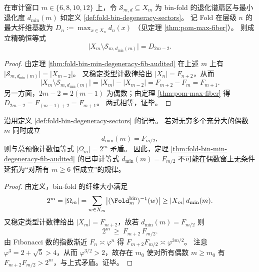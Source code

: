 \begin{corollary}\label{cor:fold-bin-minsector-complement-maxfiber-audited}
在审计窗口 \(m\in\{6,8,10,12\}\) 上，令 \(\mathcal{S}_{m,d}\subseteq X_m\) 为 bin-fold 的退化谱扇区与最小退化度 \(d_{\min}(m)\) 如定义 \ref{def:fold-bin-degeneracy-sectors}。
记 Fold 在层级 \(n\) 的最大纤维基数为
\(
D_n:=\max_{x\in X_n} d_n(x)
\)
（见定理 \ref{thm:pom-max-fiber}）。
则成立精确恒等式
\[
\bigl|X_m\setminus \mathcal{S}_{m,d_{\min}(m)}\bigr| = D_{2m-2}.
\]
\end{corollary}
\begin{proof}
由定理 \ref{thm:fold-bin-min-degeneracy-fib-audited} 在上述 \(m\) 上有 \(\bigl|\mathcal{S}_{m,d_{\min}(m)}\bigr|=|X_{m-2}|\)。
又稳定类型计数律给出 \(|X_n|=F_{n+2}\)，从而
\[
\bigl|X_m\setminus \mathcal{S}_{m,d_{\min}(m)}\bigr|
=|X_m|-|X_{m-2}|
=F_{m+2}-F_m
=F_{m+1}.
\]
另一方面，\(2m-2=2(m-1)\) 为偶数；由定理 \ref{thm:pom-max-fiber} 得
\(
D_{2m-2}=F_{(m-1)+2}=F_{m+1}
\)。
两式相等，证毕。
\end{proof}

\begin{corollary}\label{cor:fold-bin-min-degeneracy-fib-nonpersistent}
沿用定义 \ref{def:fold-bin-degeneracy-sectors} 的记号。
若对无穷多个充分大的偶数 \(m\) 同时成立
\[
d_{\min}(m)=F_{m/2},
\]
则与总预像计数恒等式 \(|\Omega_m|=2^m\) 矛盾。
因此，定理 \ref{thm:fold-bin-min-degeneracy-fib-audited} 的已审计等式 \(d_{\min}(m)=F_{m/2}\) 不可能在偶数窗上无条件延拓为“对所有 \(m\ge 6\) 恒成立”的规律。
\end{corollary}
\begin{proof}
由定义，bin-fold 的纤维大小满足
\[
2^m
=|\Omega_m|
=\sum_{w\in X_m}\bigl|(\Fold_m^{\mathrm{bin}})^{-1}(w)\bigr|
\ge |X_m|\,d_{\min}(m).
\]
又稳定类型计数律给出 \(|X_m|=F_{m+2}\)，故若 \(d_{\min}(m)=F_{m/2}\) 则
\[
2^m\ \ge\ F_{m+2}\,F_{m/2}.
\]
由 Fibonacci 数的指数渐近 \(F_n\asymp \varphi^n\) 得 \(F_{m+2}F_{m/2}\asymp \varphi^{3m/2}\)。
注意 \(\varphi^3=2+\sqrt5>4\)，从而 \(\varphi^{3/2}>2\)，故存在 \(m_0\) 使对所有偶数 \(m\ge m_0\) 有 \(F_{m+2}F_{m/2}>2^m\)，与上式矛盾。证毕。
\end{proof}

